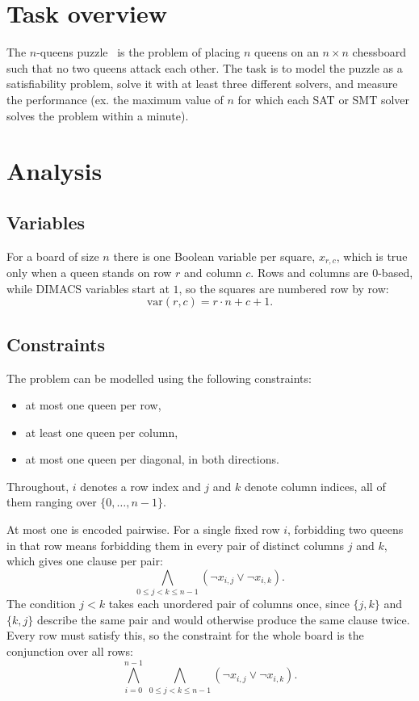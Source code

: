 \documentclass[11pt,a4paper]{article}
\begin{document}
\makereporttitle

\section{Task overview}

The $n$-queens puzzle~\cite{queens} is the problem of placing $n$ queens on an
$n \times n$
chessboard such that no two queens attack each other. The task is to model
the puzzle as a satisfiability problem, solve it with at least three
different solvers, and measure the performance (ex. the maximum value of 
$n$ for which each SAT or SMT solver solves the problem within a minute).

\section{Analysis}

\subsection*{Variables}

For a board of size $n$ there is one Boolean variable per square,
$x_{r,c}$, which is true only when a queen stands on row $r$ and column $c$.
Rows and columns are $0$-based, while DIMACS variables start at $1$, so the
squares are numbered row by row:
\[
  \mathrm{var}(r,c) = r \cdot n + c + 1 .
\]

\subsection*{Constraints}

The problem can be modelled using the following constraints:
\begin{itemize}
  \item at most one queen per row,
  \item at least one queen per column,
  \item at most one queen per diagonal, in both directions.
\end{itemize}

Throughout, $i$ denotes a row index and $j$ and $k$ denote column indices,
all of them ranging over $\{0, \dots, n-1\}$.

At most one is encoded pairwise. For a single fixed row $i$, forbidding two
queens in that row means forbidding them in every pair of distinct columns
$j$ and $k$, which gives one clause per pair:
\[
  \bigwedge_{0 \le j < k \le n-1}
  \left( \neg x_{i,j} \vee \neg x_{i,k} \right).
\]
The condition $j < k$ takes each unordered pair of columns once, since
$\{j,k\}$ and $\{k,j\}$ describe the same pair and would otherwise produce
the same clause twice. Every row must satisfy this, so the constraint for
the whole board is the conjunction over all rows:
\[
  \bigwedge_{i=0}^{n-1} \ \bigwedge_{0 \le j < k \le n-1}
  \left( \neg x_{i,j} \vee \neg x_{i,k} \right).
\]
\end{document}
